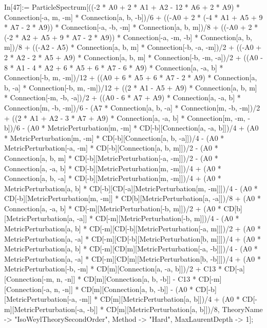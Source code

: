 In[47]:= ParticleSpectrum[((-2 * A0 + 2 * A1 + A2 - 12 * A6 + 2 * A9) * Connection[-a, m, -m] * Connection[a, b, -b])/6 + ((-A0 + 2 * (-4 * A1 + A5 + 9 * A7 - 2 * A9)) * Connection[-a, -b, -m] * Connection[a, b, m])/8 + ((-A0 + 2 * (-2 * A2 + A5 + 9 * A7 - 2 * A9)) * Connection[-a, -m, -b] * Connection[a, b, m])/8 + ((-A2 - A5) * Connection[a, b, m] * Connection[-b, -a, -m])/2 + ((-A0 + 2 * A2 - 2 * A5 + A9) * Connection[a, b, m] * Connection[-b, -m, -a])/2 + ((A0 - 8 * A1 - 4 * A2 + 6 * A5 + 6 * A7 - 6 * A9) * Connection[a, -a, b] * Connection[-b, m, -m])/12 + ((A0 + 6 * A5 + 6 * A7 - 2 * A9) * Connection[a, b, -a] * Connection[-b, m, -m])/12 + ((2 * A1 - A5 + A9) * Connection[a, b, m] * Connection[-m, -b, -a])/2 + ((A0 - 6 * A7 + A9) * Connection[a, -a, b] * Connection[m, -b, -m])/6 - (A7 * Connection[a, b, -a] * Connection[m, -b, -m])/2 + ((2 * A1 + A2 - 3 * A7 + A9) * Connection[a, -a, b] * Connection[m, -m, -b])/6 - (A0 * MetricPerturbation[m, -m] * CD[-b][Connection[a, -a, b]])/4 + (A0 * MetricPerturbation[m, -m] * CD[-b][Connection[a, b, -a]])/4 - (A0 * MetricPerturbation[-a, -m] * CD[-b][Connection[a, b, m]])/2 - (A0 * Connection[a, b, m] * CD[-b][MetricPerturbation[-a, -m]])/2 - (A0 * Connection[a, -a, b] * CD[-b][MetricPerturbation[m, -m]])/4 + (A0 * Connection[a, b, -a] * CD[-b][MetricPerturbation[m, -m]])/4 + (A0 * MetricPerturbation[a, b] * CD[-b][CD[-a][MetricPerturbation[m, -m]]])/4 - (A0 * CD[-b][MetricPerturbation[m, -m]] * CD[b][MetricPerturbation[a, -a]])/8 + (A0 * Connection[a, -a, b] * CD[-m][MetricPerturbation[-b, m]])/2 + (A0 * CD[b][MetricPerturbation[a, -a]] * CD[-m][MetricPerturbation[-b, m]])/4 - (A0 * MetricPerturbation[a, b] * CD[-m][CD[-b][MetricPerturbation[-a, m]]])/2 + (A0 * MetricPerturbation[a, -a] * CD[-m][CD[-b][MetricPerturbation[b, m]]])/4 + (A0 * MetricPerturbation[a, b] * CD[-m][CD[m][MetricPerturbation[-a, -b]]])/4 - (A0 * MetricPerturbation[a, -a] * CD[-m][CD[m][MetricPerturbation[b, -b]]])/4 + (A0 * MetricPerturbation[-b, -m] * CD[m][Connection[a, -a, b]])/2 + C13 * CD[-a][Connection[-m, n, -n]] * CD[m][Connection[a, b, -b]] - C13 * CD[-m][Connection[-a, n, -n]] * CD[m][Connection[a, b, -b]] - (A0 * CD[-b][MetricPerturbation[-a, -m]] * CD[m][MetricPerturbation[a, b]])/4 + (A0 * CD[-m][MetricPerturbation[-a, -b]] * CD[m][MetricPerturbation[a, b]])/8, TheoryName -> "IsoWeylTheorySecondOrder", Method -> "Hard", MaxLaurentDepth -> 1]; 